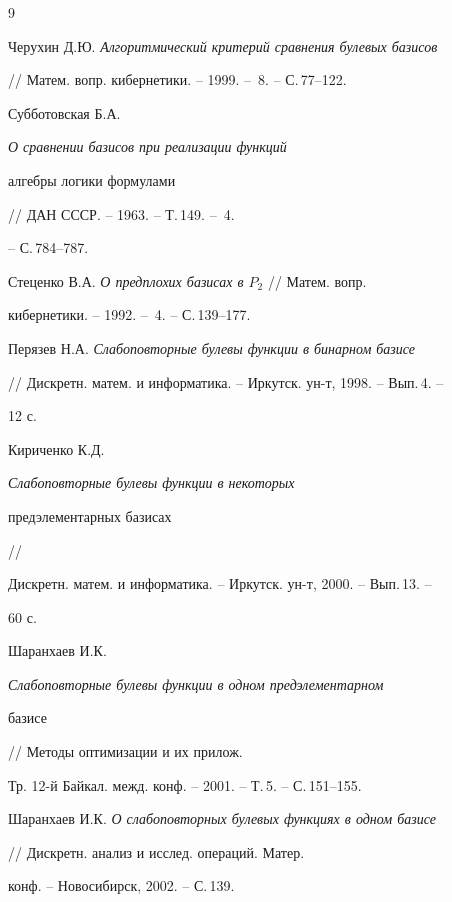  


 


\begin{thebibliography}{9} 


 




Черухин Д.Ю. {\em Алгоритмический критерий сравнения булевых базисов} 


// Матем. вопр. кибернетики. -- 1999. -- \No\,8. -- С.\,77--122. 




Субботовская Б.А. {\em О сравнении базисов при реализации функций 


алгебры логики формулами} // ДАН СССР. -- 1963. -- Т.\,149. -- \No\,4. 


-- С.\,784--787. 




Стеценко В.А. {\em О предплохих базисах в $P_2$} // Матем. вопр. 


кибернетики. -- 1992. -- \No\,4. -- С.\,139--177. 




Перязев Н.А. {\em Слабоповторные булевы функции в бинарном базисе} 


// Дискретн. матем. и информатика. -- Иркутск. ун-т, 1998. -- Вып.\,4. -- 


12 с. 




Кириченко К.Д. {\em Слабоповторные булевы функции в некоторых 


предэлементарных базисах} // 


Дискретн. матем. и информатика. -- Иркутск. ун-т, 2000. -- Вып.\,13. -- 


60 с. 




Шаранхаев И.К. {\em Слабоповторные булевы функции в одном предэлементарном 


базисе} // Методы оптимизации и их прилож. 


Тр. 12-й Байкал. межд. конф. -- 2001. -- Т.\,5. -- С.\,151--155. 




Шаранхаев И.К. {\em О слабоповторных булевых функциях в одном базисе} 


// Дискретн. анализ и исслед. операций. Матер. 


конф. -- Новосибирск, 2002. -- С.\,139. 


 


\end{thebibliography} 


 


\vskip 2cm 


 






 


\label{end} 


 


